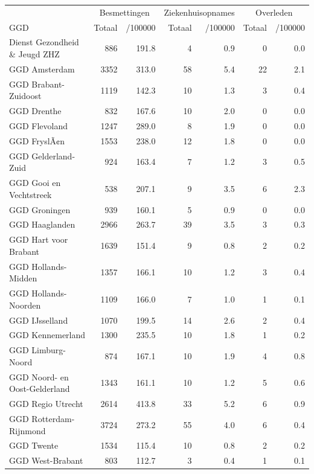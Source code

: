 \documentclass[
  english,
  man,floatsintext]{apa6}
\begin{document}
\begin{table}
\centering\begingroup\fontsize{10}{12}\selectfont

\begin{threeparttable}
\begin{tabular}{lrrrrrr}
\toprule
\multicolumn{1}{c}{ } & \multicolumn{2}{c}{Besmettingen} & \multicolumn{2}{c}{Ziekenhuisopnames} & \multicolumn{2}{c}{Overleden} \\
\cmidrule(l{3pt}r{3pt}){2-3} \cmidrule(l{3pt}r{3pt}){4-5} \cmidrule(l{3pt}r{3pt}){6-7}
GGD & Totaal & /100000 & Totaal & /100000 & Totaal & /100000\\
\midrule
Dienst Gezondheid \& Jeugd ZHZ & 886 & 191.8 & 4 & 0.9 & 0 & 0.0\\
GGD Amsterdam & 3352 & 313.0 & 58 & 5.4 & 22 & 2.1\\
GGD Brabant-Zuidoost & 1119 & 142.3 & 10 & 1.3 & 3 & 0.4\\
GGD Drenthe & 832 & 167.6 & 10 & 2.0 & 0 & 0.0\\
GGD Flevoland & 1247 & 289.0 & 8 & 1.9 & 0 & 0.0\\
GGD FryslÃ¢n & 1553 & 238.0 & 12 & 1.8 & 0 & 0.0\\
GGD Gelderland-Zuid & 924 & 163.4 & 7 & 1.2 & 3 & 0.5\\
GGD Gooi en Vechtstreek & 538 & 207.1 & 9 & 3.5 & 6 & 2.3\\
GGD Groningen & 939 & 160.1 & 5 & 0.9 & 0 & 0.0\\
GGD Haaglanden & 2966 & 263.7 & 39 & 3.5 & 3 & 0.3\\
GGD Hart voor Brabant & 1639 & 151.4 & 9 & 0.8 & 2 & 0.2\\
GGD Hollands-Midden & 1357 & 166.1 & 10 & 1.2 & 3 & 0.4\\
GGD Hollands-Noorden & 1109 & 166.0 & 7 & 1.0 & 1 & 0.1\\
GGD IJsselland & 1070 & 199.5 & 14 & 2.6 & 2 & 0.4\\
GGD Kennemerland & 1300 & 235.5 & 10 & 1.8 & 1 & 0.2\\
GGD Limburg-Noord & 874 & 167.1 & 10 & 1.9 & 4 & 0.8\\
GGD Noord- en Oost-Gelderland & 1343 & 161.1 & 10 & 1.2 & 5 & 0.6\\
GGD Regio Utrecht & 2614 & 413.8 & 33 & 5.2 & 6 & 0.9\\
GGD Rotterdam-Rijnmond & 3724 & 273.2 & 55 & 4.0 & 6 & 0.4\\
GGD Twente & 1534 & 115.4 & 10 & 0.8 & 2 & 0.2\\
GGD West-Brabant & 803 & 112.7 & 3 & 0.4 & 1 & 0.1\\

\end{tabular}
\end{threeparttable}
\end{table}
\end{document}
